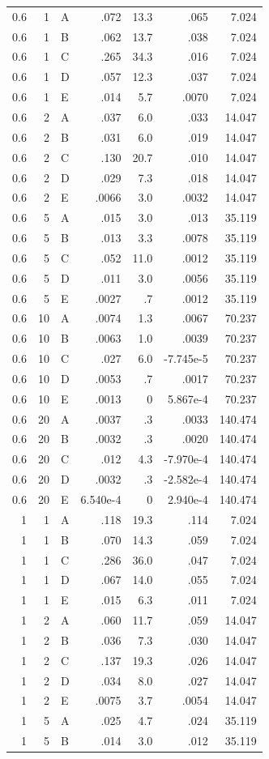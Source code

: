 \documentclass[9pt]{article}
\begin{document}
\begin{longtable}{rrlrrrr}
0.6&1&A&.072&13.3&.065&7.024\\
0.6&1&B&.062&13.7&.038&7.024\\
0.6&1&C&.265&34.3&.016&7.024\\
0.6&1&D&.057&12.3&.037&7.024\\
0.6&1&E&.014&5.7&.0070&7.024\\
0.6&2&A&.037&6.0&.033&14.047\\
0.6&2&B&.031&6.0&.019&14.047\\
0.6&2&C&.130&20.7&.010&14.047\\
0.6&2&D&.029&7.3&.018&14.047\\
0.6&2&E&.0066&3.0&.0032&14.047\\
0.6&5&A&.015&3.0&.013&35.119\\
0.6&5&B&.013&3.3&.0078&35.119\\
0.6&5&C&.052&11.0&.0012&35.119\\
0.6&5&D&.011&3.0&.0056&35.119\\
0.6&5&E&.0027&.7&.0012&35.119\\
0.6&10&A&.0074&1.3&.0067&70.237\\
0.6&10&B&.0063&1.0&.0039&70.237\\
0.6&10&C&.027&6.0&-7.745e-5&70.237\\
0.6&10&D&.0053&.7&.0017&70.237\\
0.6&10&E&.0013&0&5.867e-4&70.237\\
0.6&20&A&.0037&.3&.0033&140.474\\
0.6&20&B&.0032&.3&.0020&140.474\\
0.6&20&C&.012&4.3&-7.970e-4&140.474\\
0.6&20&D&.0032&.3&-2.582e-4&140.474\\
0.6&20&E&6.540e-4&0&2.940e-4&140.474\\
1&1&A&.118&19.3&.114&7.024\\
1&1&B&.070&14.3&.059&7.024\\
1&1&C&.286&36.0&.047&7.024\\
1&1&D&.067&14.0&.055&7.024\\
1&1&E&.015&6.3&.011&7.024\\
1&2&A&.060&11.7&.059&14.047\\
1&2&B&.036&7.3&.030&14.047\\
1&2&C&.137&19.3&.026&14.047\\
1&2&D&.034&8.0&.027&14.047\\
1&2&E&.0075&3.7&.0054&14.047\\
1&5&A&.025&4.7&.024&35.119\\
1&5&B&.014&3.0&.012&35.119\\

\end{longtable}
\end{document}
